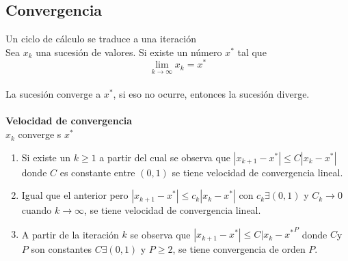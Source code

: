 \subsection{Convergencia} 
Un ciclo de c\'alculo se traduce a una iteraci\'on 
\\
Sea $x_k$ una sucesi\'on de valores. Si existe un n\'umero $x^*$ tal que $$\lim\limits_{k\to\infty}x_k=x^*$$ \\
La sucesi\'on converge a $x^*$, si eso no ocurre, entonces la sucesi\'on diverge.
\\ \\ 
\textbf{Velocidad de convergencia}\\ 
${x_k}$ converge s $x^*$ \\
\begin{enumerate}
\item Si existe un $k\geq 1$ a partir del cual se observa que $|x_{k+1}-x^*|\leq C|x_k-x^*|$ donde $C$ es constante entre $(0,1)$ se tiene velocidad de convergencia lineal.
\item Igual que el anterior pero $|x_{k+1}-x^*|\leq c_k|x_k-x^*|$ con $c_k\exists(0,1)$ y $C_k\to0$ cuando $k\to\infty$, se tiene  velocidad de convergencia lineal.
\item A partir de la iteraci\'on $k$ se observa que $|x_{k+1}-x^*|\leq C{|x_k-x^*}^P$ donde $C$y $P$ son constantes $C\exists(0,1)$ y $P\geq2$, se tiene convergencia de orden $P$.
\end{enumerate}


